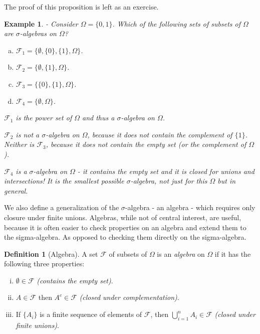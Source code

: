 \documentclass{book}
\theoremstyle{plain}%
\newtheorem{prototheorem}{Example}[section]
\newenvironment{cexample}
   {\colorlet{shadecolor}{gray!10}\begin{shaded}\begin{prototheorem}}
   {\end{prototheorem}\end{shaded}}
\theoremstyle{definition}
\newtheorem{definition}{Definition}[section]
\begin{document}
The proof of this proposition is left as an exercise.

\begin{cexample}{}{-}
Consider $\Omega = \{0, 1\}$. Which of the following sets of subsets of $\Omega$ are $\sigma$-algebras on $\Omega$?

\begin{enumerate}[(a)]
\item $\mathcal{F}_1 = \{\emptyset, \{0\}, \{1\},\Omega\}$.
\item $\mathcal{F}_2 = \{\emptyset, \{1\},\Omega\}$.
\item $\mathcal{F}_3 = \{\{0\}, \{1\},\Omega\}$.
\item $\mathcal{F}_4 = \{\emptyset, \Omega\}$.
\end{enumerate}

$\mathcal{F}_1$ is the power set of $\Omega$ and thus a $\sigma$-algebra on $\Omega$.

$\mathcal{F}_2$ is not a $\sigma$-algebra on $\Omega$, because it does not contain the complement of $\{1\}$. Neither is $\mathcal{F}_3$, because it does not contain the empty set (or the complement of $\Omega$).

$\mathcal{F}_4$ is a $\sigma$-algebra on $\Omega$ - it contains the empty set and it is closed for unions and intersections! It is the smallest possible $\sigma$-algebra, not just for this $\Omega$ but in general.

\end{cexample}

We also define a generalization of the $\sigma$-algebra - an algebra - which requires only closure under finite unions. Algebras, while not of central interest, are useful, because it is often easier to check properties on an algebra and extend them to the sigma-algebra. As opposed to checking them directly on the sigma-algebra.

\begin{definition}[Algebra]
A set $\mathcal{F}$ of subsets of $\Omega$ is an \emph{algebra} on $\Omega$ if it has the following three properties:

\begin{enumerate}[(i)]
\item $\emptyset \in  \mathcal{F}$ \textit{(contains the empty set)}.
\item $A \in \mathcal{F}$ then $A^c \in \mathcal{F}$ \textit{(closed under complementation)}.
\item If $\{A_i\}$ is a finite sequence of elements of $\mathcal{F}$,  then $\bigcup_{i=1}^n A_i \in \mathcal{F}$ \textit{(closed under finite unions)}.
\end{enumerate}
\end{definition}
\end{document}
